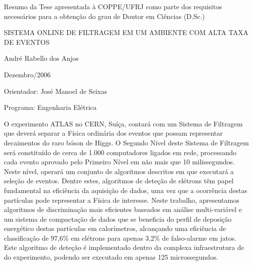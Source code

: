 \newenvironment{summary}[1]{%
\begin{minipage}{\linewidth}%
\newcommand{\saveparameter}{\baselinestretch}%
\renewcommand{\baselinestretch}{#1}%
\normalsize}%
{%
\renewcommand{\baselinestretch}{\saveparameter}%
\end{minipage}%
}


\noindent
Resumo da Tese apresentada à COPPE/UFRJ como parte dos requisitos necessários
para a obtenção do grau de Doutor em Ciências (D.Sc.)

\vspace{1.5cm}

\begin{center}
SISTEMA ONLINE DE FILTRAGEM EM UM AMBIENTE COM ALTA TAXA DE EVENTOS
\vspace{1cm}

André Rabello dos Anjos
\vspace{1cm}

Dezembro/2006
\end{center}
\vspace{1.5cm}

\noindent
Orientador: José Manoel de Seixas
\vspace{1.5cm}

\noindent
Programa: Engenharia Elétrica
\vspace{2cm}

\begin{summary}{1.2}
\hspace{0.8cm}O experimento ATLAS no CERN, Suíça, contará com um Sistema de
Filtragem que deverá separar a Física ordinária dos eventos que possam
representar decaimentos do raro bóson de Higgs. O Segundo Nível deste Sistema
de Filtragem será constituído de cerca de 1.000 computadores ligados em rede,
processando cada evento aprovado pelo Primeiro Nível em não mais que 10
milissegundos. Neste nível, operará um conjunto de algoritmos descritos em
 que executará a seleção de eventos. Dentre estes, algoritmos de
deteção de elétrons têm papel fundamental na eficiência da aquisição de dados,
uma vez que a ocorrência destas partículas pode representar a Física de
interesse. Neste trabalho, apresentamos algoritmos de discriminação mais
eficientes baseados em análise multi-variável e um sistema de compactação de
dados que se beneficia do perfil de deposição energético destas partículas em
calorímetros, alcançando uma eficiência de classificação de 97,6\% em elétrons
para apenas 3,2\% de falso-alarme em jatos. Este algoritmo de deteção é
implementado dentro da complexa infraestrutura de  do
experimento, podendo ser executado em apenas 125 microssegundos.
\end{summary}

